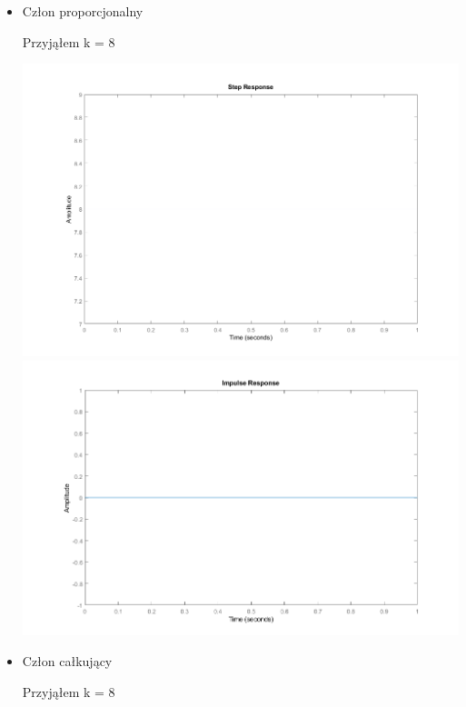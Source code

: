 \documentclass[a4paper,10pt]{article}
\begin{document}
\begin{itemize}
\item Człon proporcjonalny

	Przyjąłem k = 8
	\begin{center}
		\includegraphics[width=15cm]{prop_step.png}
		\includegraphics[width=15cm]{prop_impulse.png}
	\end{center}
	
	
\item Człon całkujący

	Przyjąłem k = 8
	

\end{itemize}
\end{document}
